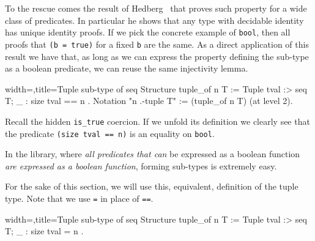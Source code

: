 To the rescue comes the result of Hedberg~\cite{Hedberg}
that proves such property for a wide class of predicates.
In particular he shows that any type with decidable identity
has unique identity proofs.  If we pick the concrete example
of \lstinline/bool/, then all proofs that \lstinline/(b = true)/
for a fixed \lstinline/b/ are the same.
As a direct application of this result we have that, as long as we can
express the property defining the sub-type as a boolean predicate,
we can reuse the same injectivity lemma.

\begin{coq}{width=\textwidth,title=Tuple sub-type of seq}
Structure tuple_of n T :=  Tuple { tval :> seq T; _ : size tval == n }.
Notation "n .-tuple T" := (tuple_of n T) (at level 2).
\end{coq}

Recall the hidden \lstinline/is_true/ coercion.  If we unfold
its definition we clearly see that the predicate
\lstinline/(size tval == n)/ is an equality on \lstinline/bool/.

In the \mcbMC{} library, where \emph{all predicates that can} be
expressed as a boolean function \emph{are expressed as a boolean
function}, forming sub-types is extremely easy.

%


For the sake of this section, we will use this, equivalent, definition
of the tuple type.  Note that we use \lstinline/=/ in place of
\lstinline/==/.

\begin{coq}{width=\textwidth,title=Tuple sub-type of seq}
Structure tuple_of n T :=  Tuple { tval :> seq T; _ : size tval = n }.
\end{coq}



